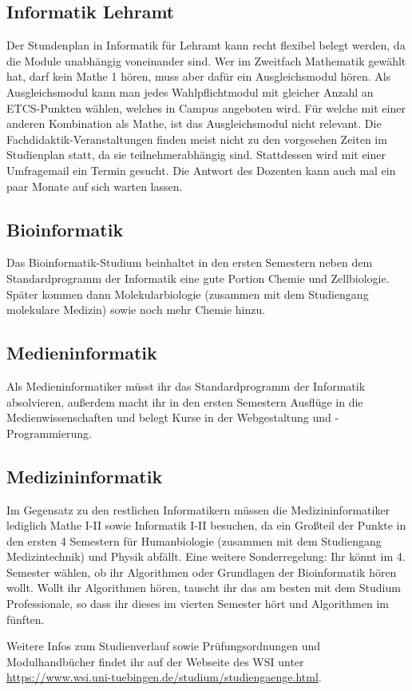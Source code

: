 \subsection*{Informatik Lehramt}
	
\pagebreak 
Der Stundenplan in Informatik für Lehramt kann recht flexibel belegt werden, da die Module unabhängig voneinander sind. Wer im Zweitfach Mathematik gewählt hat, darf kein Mathe 1 hören, muss aber dafür ein Ausgleichsmodul hören. Als Ausgleichsmodul kann man jedes Wahlpflichtmodul mit gleicher Anzahl an ETCS-Punkten wählen, welches in Campus angeboten wird. Für welche mit einer anderen Kombination als Mathe, ist das Ausgleichsmodul nicht relevant. Die Fachdidaktik-Veranstaltungen finden meist nicht zu den vorgesehen Zeiten im Studienplan statt, da sie teilnehmerabhängig sind. Stattdessen wird mit einer Umfragemail ein Termin gesucht. Die Antwort des Dozenten kann auch mal ein paar Monate auf sich warten lassen.

\subsection*{Bioinformatik}
	
Das Bioinformatik-Studium beinhaltet in den ersten Semestern neben dem Standardprogramm der Informatik eine gute Portion Chemie und Zellbiologie. Später kommen dann Molekularbiologie (zusammen mit dem Studiengang molekulare Medizin) sowie noch mehr Chemie hinzu.
\pagebreak 
\subsection*{Medieninformatik}
	
Als Medieninformatiker müsst ihr das Standardprogramm der Informatik absolvieren, außerdem macht ihr in den ersten Semestern Ausflüge in die Medienwissenschaften und belegt Kurse in der Webgestaltung und -Programmierung.
\subsection*{Medizininformatik}
	
Im Gegensatz zu den restlichen Informatikern müssen die Medizininformatiker lediglich Mathe I-II sowie Informatik I-II besuchen, da ein Großteil der Punkte in den ersten 4 Semestern für Humanbiologie (zusammen mit dem Studiengang Medizintechnik) und Physik abfällt. Eine weitere Sonderregelung: Ihr könnt im 4. Semester wählen, ob ihr Algorithmen oder Grundlagen der Bioinformatik hören wollt. Wollt ihr Algorithmen hören, tauscht ihr das am besten mit dem Studium Professionale, so dass ihr dieses im vierten Semester hört und Algorithmen im fünften.

Weitere Infos zum Studienverlauf sowie Prüfungsordnungen und Modulhandbücher findet ihr auf der Webseite des WSI unter \url{https://www.wsi.uni-tuebingen.de/studium/studiengaenge.html}.	%
\pagebreak